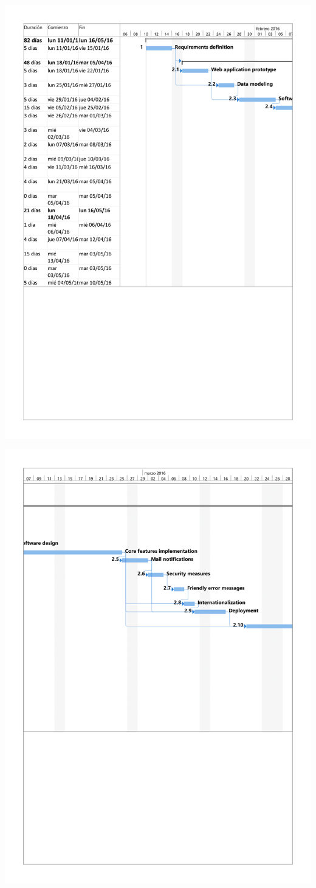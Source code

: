 \documentclass{DeustoFDP}
\begin{document}
\begin{center}
	\includegraphics[width=0.9\linewidth]{fig/g2}
\end{center}
\begin{center}
	\includegraphics[width=0.9\linewidth]{fig/g3}
\end{center}
\end{document}
